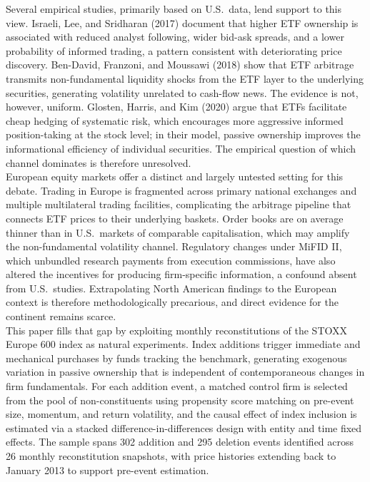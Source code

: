 \documentclass[12pt, a4paper]{article}
\begin{document}
Several empirical studies, primarily based on U.S.\ data, lend support to this view. Israeli, Lee, and Sridharan (2017) document that higher ETF ownership is associated with reduced analyst following, wider bid-ask spreads, and a lower probability of informed trading, a pattern consistent with deteriorating price discovery. Ben-David, Franzoni, and Moussawi (2018) show that ETF arbitrage transmits non-fundamental liquidity shocks from the ETF layer to the underlying securities, generating volatility unrelated to cash-flow news. The evidence is not, however, uniform. Glosten, Harris, and Kim (2020) argue that ETFs facilitate cheap hedging of systematic risk, which encourages more aggressive informed position-taking at the stock level; in their model, passive ownership improves the informational efficiency of individual securities. The empirical question of which channel dominates is therefore unresolved.\\

European equity markets offer a distinct and largely untested setting for this debate. Trading in Europe is fragmented across primary national exchanges and multiple multilateral trading facilities, complicating the arbitrage pipeline that connects ETF prices to their underlying baskets. Order books are on average thinner than in U.S.\ markets of comparable capitalisation, which may amplify the non-fundamental volatility channel. Regulatory changes under MiFID II, which unbundled research payments from execution commissions, have also altered the incentives for producing firm-specific information, a confound absent from U.S.\ studies. Extrapolating North American findings to the European context is therefore methodologically precarious, and direct evidence for the continent remains scarce.\\

This paper fills that gap by exploiting monthly reconstitutions of the STOXX Europe 600 index as natural experiments. Index additions trigger immediate and mechanical purchases by funds tracking the benchmark, generating exogenous variation in passive ownership that is independent of contemporaneous changes in firm fundamentals. For each addition event, a matched control firm is selected from the pool of non-constituents using propensity score matching on pre-event size, momentum, and return volatility, and the causal effect of index inclusion is estimated via a stacked difference-in-differences design with entity and time fixed effects. The sample spans 302 addition and 295 deletion events identified across 26 monthly reconstitution snapshots, with price histories extending back to January 2013 to support pre-event estimation.\\
\end{document}
